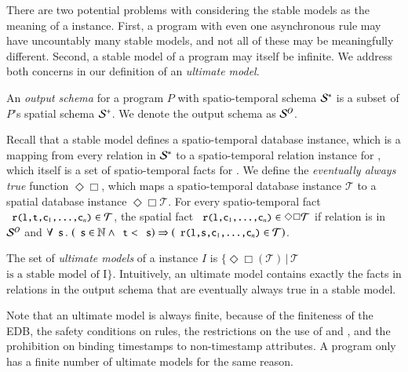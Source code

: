 
There are two potential problems with considering the stable models as the meaning of a \lang instance.  
First, a program with even one asynchronous rule may have uncountably many stable models, and not all of these may be meaningfully different.  Second, a stable model of a \lang program may itself be infinite.  We address both concerns in our definition of an {\em ultimate model}.

An {\em output schema} for a \lang program $P$ with spatio-temporal schema
$\stschema$ is a subset of $P$'s spatial schema $\sschema$.  We denote the output schema as
$\oschema$.

Recall that a stable model defines a spatio-temporal database instance, which is a mapping from every relation  in $\stschema$ to a spatio-temporal relation instance for , which itself is a set of spatio-temporal facts for .  We define the {\em eventually always true} function $\Diamond\Box$, which maps a spatio-temporal database instance $\mathcal{T}$ to a spatial database instance $\Diamond\Box\mathcal{T}$.  For every spatio-temporal fact $\dedalus{r(l,t,c\sub{1},\ldots,c\sub{n})} \in \mathcal{T}$, the spatial fact $\dedalus{r(l,c\sub{1},\ldots,c\sub{n})} \in \Diamond\Box\mathcal{T}$ if relation  is in $\oschema$ and $\forall \dedalus{s}\, . \, \left(\dedalus{s} \in \mathbb{N} \land \dedalus{t} < \dedalus{s}\right) \Rightarrow \left(\dedalus{r(l,s,c\sub{1},\ldots,c\sub{n})} \in \mathcal{T}\right)$.

The set of {\em ultimate models} of a \lang instance $I$ is $\{\Diamond\Box(\mathcal{T}) \, | \, \mathcal{T}$  $\text{is a stable model of I}\}$.  Intuitively, an ultimate model contains exactly the facts in relations in the output schema that are eventually always true in a stable model.

Note that an ultimate model is always finite, because of the finiteness of the EDB, the safety conditions on rules, the restrictions on the use of  and , and the prohibition on binding timestamps to non-timestamp attributes.  A \lang program only has a finite number of ultimate models for the same reason.

